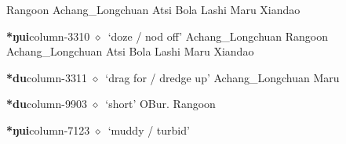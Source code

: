 \hspace{1ex}
         Rangoon 
\hspace{1ex}
         Achang\_Longchuan 
\hspace{1ex}
         Atsi 
\hspace{1ex}
         Bola 
\hspace{1ex}
         Lashi 
\hspace{1ex}
         Maru 
\hspace{1ex}
         Xiandao 
  \item {\footnotesize \textbf{*ŋui}}{\tiny column-3310}
         $\diamond$~`doze / nod off'
         Achang\_Longchuan 
\hspace{1ex}
         Rangoon 
\hspace{1ex}
         Achang\_Longchuan 
\hspace{1ex}
         Atsi 
\hspace{1ex}
         Bola 
\hspace{1ex}
         Lashi 
\hspace{1ex}
         Maru 
\hspace{1ex}
         Xiandao 
  \item {\footnotesize \textbf{*du}}{\tiny column-3311}
         $\diamond$~`drag for / dredge up'
         Achang\_Longchuan 
\hspace{1ex}
         Maru 
  \item {\footnotesize \textbf{*du}}{\tiny column-9903}
         $\diamond$~`short'
         OBur. 
\hspace{1ex}
         Rangoon 
  \item {\footnotesize \textbf{*ŋui}}{\tiny column-7123}
         $\diamond$~`muddy / turbid'
